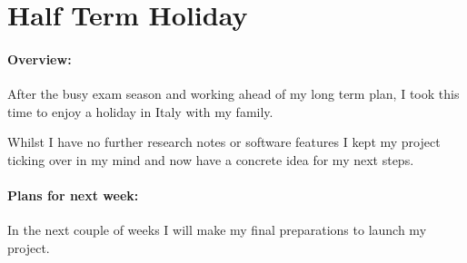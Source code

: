 \section{Half Term Holiday}

\paragraph{Overview:}
After the busy exam season and working ahead of my long term plan, I took this time to enjoy a holiday in Italy with my family.

Whilst I have no further research notes or software features I kept my project ticking over in my mind and now have a concrete idea for my next steps.

\paragraph{Plans for next week:}
In the next couple of weeks I will make my final preparations to launch my project.
